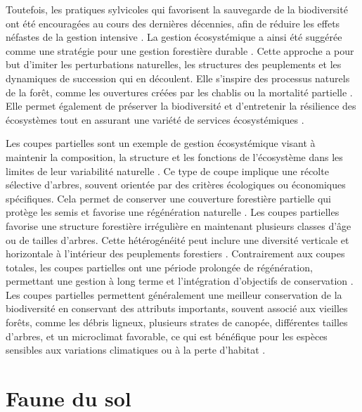 Toutefois, les pratiques sylvicoles qui favorisent la sauvegarde de la biodiversité ont été encouragées au cours des dernières décennies, afin de réduire les effets néfastes de la gestion intensive \citep{Gustafsson2012Retentionforestry}. 
La gestion écosystémique a ainsi été suggérée comme une stratégie pour une gestion forestière durable \citep{Perry1998scientificbasis,Kuuluvainen2002Naturalvariabilitya}. 
Cette approche a pour but d'imiter les perturbations naturelles, les structures des peuplements et les dynamiques de succession qui en découlent. 
Elle s'inspire des processus naturels de la forêt, comme les ouvertures créées par les chablis ou la mortalité partielle \citep{Bergeron2007Usingknowledge}.
Elle permet également de préserver la biodiversité et d'entretenir la résilience des écosystèmes tout en assurant une variété de services écosystémiques \citep{Szaro1998emergenceecosystem,MacDicken2015Globalprogress}. 

Les coupes partielles sont un exemple de gestion écosystémique visant à maintenir la composition, 
la structure et les fonctions de l'écosystème dans les limites de leur variabilité naturelle \citep{Bergeron1999Forestmanagementa,Raymond2009irregularshelterwood}.
Ce type de coupe implique une récolte sélective d'arbres, souvent orientée par des critères écologiques ou économiques spécifiques. 
Cela permet de conserver une couverture forestière partielle qui protège les semis et favorise une régénération naturelle \citep{Raymond2009irregularshelterwood}.
Les coupes partielles favorise une structure forestière irrégulière en maintenant plusieurs classes d'âge ou de tailles d'arbres. 
Cette hétérogénéité peut inclure une diversité verticale et horizontale à l'intérieur des peuplements forestiers \citep{Raymond2009irregularshelterwood}.
Contrairement aux coupes totales, les coupes partielles ont une période prolongée de régénération, 
permettant une gestion à long terme et l'intégration d'objectifs de conservation \citep{Raymond2009irregularshelterwood}.
Les coupes partielles permettent généralement une meilleur conservation de la biodiversité en conservant des attributs importants, 
souvent associé aux vieilles forêts, comme les débris ligneux, plusieurs strates de canopée, différentes tailles d'arbres, et un microclimat favorable, 
ce qui est bénéfique pour les espèces sensibles aux variations climatiques ou à la perte d'habitat \citep{Hansen1991Conservingbiodiversity}. 


\section*{Faune du sol}
\label{sec:soilfauna}

